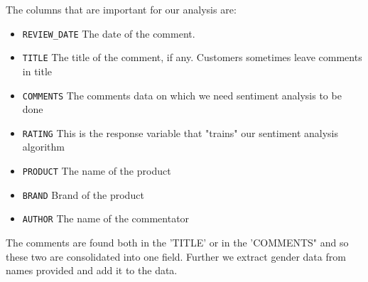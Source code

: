 \documentclass[11pt, letterpaper]{article}
\begin{document}
The columns that are important for our analysis are:
\begin{itemize}
    \item \verb|REVIEW_DATE| The date of the comment. 
    \item \verb|TITLE| The title of the comment, if any. Customers sometimes leave comments in title
    \item \verb|COMMENTS| The comments data on which we need sentiment analysis to be done
    \item \verb|RATING| This is the response variable that "trains" our sentiment analysis algorithm
    \item \verb|PRODUCT| The name of the product 
    \item \verb|BRAND|   Brand of the product
    \item \verb|AUTHOR|  The name of the commentator
\end{itemize}
The comments are found both in the 'TITLE' or in the 'COMMENTS" and so these two are consolidated into one field. Further we extract gender data from names provided and add it to the data. 
\end{document}

